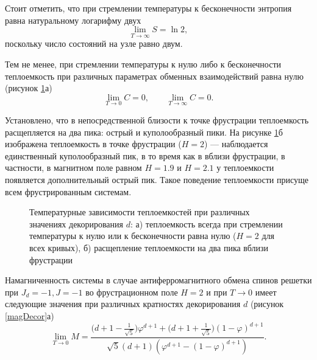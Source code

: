 Стоит отметить, что при стремлении температуры к бесконечности энтропия равна натуральному логарифму двух 
\begin{equation}
\lim_{T\rightarrow \infty} S = \ln 2,
\label{23d}
\end{equation}
поскольку число состояний на узле равно двум.

Тем не менее, при стремлении температуры к нулю либо к бесконечности теплоемкость при различных параметрах обменных взаимодействий равна нулю (рисунок \ref{heatDecor}а)
\begin{equation}
\lim_{T\rightarrow 0} C = 0,\;\;\;\;\;\;\;\lim_{T\rightarrow \infty} C = 0.
\label{24d}
\end{equation}

Установлено, что в непосредственной близости к точке фрустрации теплоемкость расщепляется на два пика: острый и куполообразный пики. На рисунке \ref{heatDecor}б изображена теплоемкость в точке фрустрации ($H=2$) --- наблюдается единственный куполообразный пик, в то время как в вблизи фрустрации, в частности, в магнитном поле равном $H=1.9$ и $H=2.1$ у теплоемкости появляется дополнительный острый пик. Такое поведение теплоемкости присуще всем фрустрированным системам.

 \begin{figure}[h]
 	\begin{minipage}{0.49\linewidth}
 	\end{minipage}
 	\hfill
 	\begin{minipage}{0.49\linewidth}
 	\end{minipage}
 	\caption{Температурные зависимости теплоемкостей при различных значениях декорирования $d$: а) теплоемкость всегда при стремлении температуры к нулю или к бесконечности равна нулю ($H=2$ для всех кривых), б) расщепление теплоемкости на два пика вблизи фрустрации}
 	\label{heatDecor}
 \end{figure}

Намагниченность системы в случае антиферромагнитного обмена спинов решетки при $J_d=-1, J=-1$ во фрустрационном поле $H=2$ и при $T\rightarrow 0$ имеет следующие значения при различных кратностях декорирования $d$ (рисунок \ref{magDecor}а)
\begin{equation}
\lim_{T \rightarrow 0} M = \frac{\Big(d+1-\frac{1}{\sqrt{5}}\Big)\varphi^{d+1}+\Big(d+1+\frac{1}{\sqrt{5}}\Big)(1-\varphi)^{d+1}}{\sqrt{5}(d+1)(\varphi^{d+1}-(1-\varphi)^{d+1})}.
\label{25d}
\end{equation}


